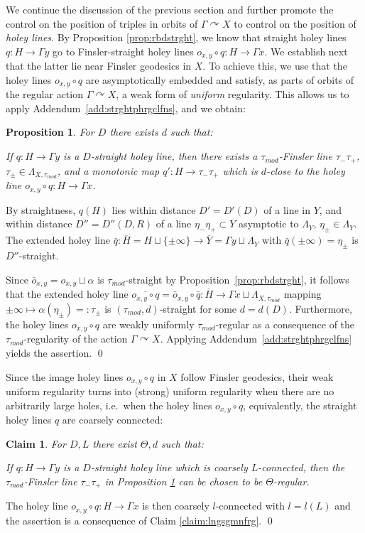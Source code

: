 \documentclass[12pt]{article}
\theoremstyle{boldplain}
\newtheorem{claim}[equation]{Claim}
\newtheorem{prop}[equation]{Proposition}
\theoremstyle{bolddefinition}
\numberwithin{equation}{section}
\def\al{\alpha}
\def\Ga{\Gamma}
\def\La{\Lambda}
\def\acts{\curvearrowright}
\def\LaXt{\Lambda_{X,\tau_{mod}}}
\def\LaY{\Lambda_Y}
\def\ol{\overline}
\def\taumod{\tau_{mod}}
\begin{document}
We continue the discussion of the previous section 
and further promote the control on the position of triples in orbits of $\Ga\acts X$
to control on the position of {\em holey lines}.
By Proposition \ref{prop:rbdstrght}, 
we know that straight holey lines $q:H\to \Ga y$ go to 
Finsler-straight holey lines $o_{x,y}\circ q:H\to\Ga x$.
We establish next that the latter lie near Finsler geodesics in $X$. 
To achieve this,
we use that the holey lines $o_{x,y}\circ q$ are asymptotically embedded 
and satisfy, as parts of orbits of the regular action $\Ga\acts X$, a weak form of {\em uniform} regularity.
This allows us to apply  Addendum~\ref{add:strghtphrgclfns}, 
and we obtain:

\begin{prop}
\label{prop:hlflfns}
For $D$ there exists $d$ such that: 

If $q: H\to\Ga y$ is a $D$-straight holey line,
then there exists a $\taumod$-Finsler line $\tau_-\tau_+$, $\tau_{\pm}\in\LaXt$,
and a monotonic map $q':H\to \tau_-\tau_+$
which is $d$-close to the holey line $o_{x,y}\circ q:H\to\Ga x$. 
\end{prop}
\proof
By straightness,
$q(H)$ lies within distance $D'=D'(D)$ of a line in $Y$,
and within distance $D''=D''(D,R)$ of a line $\eta_-\eta_+\subset Y$ asymptotic to $\La_Y$, $\eta_{\pm}\in\LaY$.
The extended holey line $\bar q:\ol H=H\sqcup\{\pm\infty\}\to\ol Y=\Ga y\sqcup\LaY$
with $\bar q(\pm\infty)=\eta_{\pm}$ is $D''$-straight.

Since $\bar o_{x,y}=o_{x,y}\sqcup\al$ is 
$\taumod$-straight 
by Proposition~\ref{prop:rbdstrght}, 
it follows that the extended holey line 
$\ol{o_{x,y}\circ q}=\bar o_{x,y}\circ\bar q:\ol H\to\Ga x\sqcup\LaXt$ 
mapping $\pm\infty\mapsto\al(\eta_{\pm})=:\tau_{\pm}$
is $(\taumod,d)$-straight for some $d=d(D)$.
Furthermore, the holey lines $o_{x,y}\circ q$ are weakly uniformly $\taumod$-regular 
as a consequence of the $\taumod$-regularity of the action $\Ga\acts X$.
Applying Addendum~\ref{add:strghtphrgclfns} yields the assertion.
\qed

\medskip
Since the image holey lines $o_{x,y}\circ q$ in $X$ follow Finsler geodesics,
their weak uniform regularity turns into (strong) uniform regularity 
when there are no arbitrarily large holes,
i.e.\ when the holey lines $o_{x,y}\circ q$, equivalently, the straight holey lines $q$ are coarsely connected:
\begin{claim}
\label{claim:crscnhlnfrg}
For $D,L$ there exist $\Theta,d$ such that:

If $q:H\to\Ga y$ is a $D$-straight holey line
which is coarsely $L$-connected,
then the $\taumod$-Finsler line $\tau_-\tau_+$ in Proposition \ref{prop:hlflfns}
can be chosen to be $\Theta$-regular.
\end{claim}
\proof
The holey line $o_{x,y}\circ q:H\to\Ga x$ is then coarsely $l$-connected with $l=l(L)$
and the assertion is a consequence of Claim \ref{claim:lngsgmnfrg}.
\qed
\end{document}
